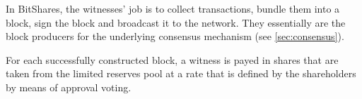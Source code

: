 In BitShares, the witnesses' job is to collect transactions, bundle them into a
block, sign the block and broadcast it to the network. They essentially are the
block producers for the underlying consensus mechanism (see
\cref{sec:consensus}).

For each successfully constructed block, a witness is payed in shares that are
taken from the limited reserves pool at a rate that is defined by the
shareholders by means of approval voting.
